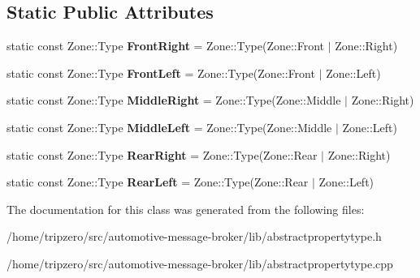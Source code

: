 \subsection*{Static Public Attributes}
\begin{DoxyCompactItemize}
\item 
\hypertarget{classZone_a37315b6f9837e00447422775a96a20ca}{static const Zone\-::\-Type {\bfseries Front\-Right} = Zone\-::\-Type(Zone\-::\-Front $|$ Zone\-::\-Right)}\label{classZone_a37315b6f9837e00447422775a96a20ca}

\item 
\hypertarget{classZone_a6a87ff703e79adeb7c1d625565b19465}{static const Zone\-::\-Type {\bfseries Front\-Left} = Zone\-::\-Type(Zone\-::\-Front $|$ Zone\-::\-Left)}\label{classZone_a6a87ff703e79adeb7c1d625565b19465}

\item 
\hypertarget{classZone_a1d569d1d452b7c9201572882076afff0}{static const Zone\-::\-Type {\bfseries Middle\-Right} = Zone\-::\-Type(Zone\-::\-Middle $|$ Zone\-::\-Right)}\label{classZone_a1d569d1d452b7c9201572882076afff0}

\item 
\hypertarget{classZone_a750a3ead97ed9634c09e2cd581052be2}{static const Zone\-::\-Type {\bfseries Middle\-Left} = Zone\-::\-Type(Zone\-::\-Middle $|$ Zone\-::\-Left)}\label{classZone_a750a3ead97ed9634c09e2cd581052be2}

\item 
\hypertarget{classZone_a0e756f33e1f50c13ee13fe46027a1359}{static const Zone\-::\-Type {\bfseries Rear\-Right} = Zone\-::\-Type(Zone\-::\-Rear $|$ Zone\-::\-Right)}\label{classZone_a0e756f33e1f50c13ee13fe46027a1359}

\item 
\hypertarget{classZone_a7c83e580e0478be716f344eb56a041e3}{static const Zone\-::\-Type {\bfseries Rear\-Left} = Zone\-::\-Type(Zone\-::\-Rear $|$ Zone\-::\-Left)}\label{classZone_a7c83e580e0478be716f344eb56a041e3}

\end{DoxyCompactItemize}


The documentation for this class was generated from the following files\-:\begin{DoxyCompactItemize}
\item 
/home/tripzero/src/automotive-\/message-\/broker/lib/abstractpropertytype.\-h\item 
/home/tripzero/src/automotive-\/message-\/broker/lib/abstractpropertytype.\-cpp\end{DoxyCompactItemize}

